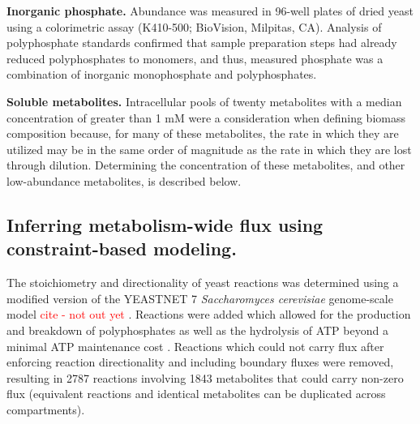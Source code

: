 \documentclass[12pt]{nature}\usepackage{graphicx, color}
\begin{document}
\textbf{Inorganic phosphate.} Abundance was measured in 96-well plates of dried yeast using a colorimetric assay (K410-500; BioVision, Milpitas, CA).  Analysis of polyphosphate standards confirmed that sample preparation steps had already reduced polyphosphates to monomers, and thus, measured phosphate was a combination of inorganic monophosphate and polyphosphates.

\textbf{Soluble metabolites.} Intracellular pools of twenty metabolites with a median concentration of greater than 1 mM were a consideration when defining biomass composition because, for many of these metabolites, the rate in which they are utilized may be in the same order of magnitude as the rate in which they are lost through dilution.  Determining the concentration of these metabolites, and other low-abundance metabolites, is described below.

\subsection{Inferring metabolism-wide flux using constraint-based modeling.}

The stoichiometry and directionality of yeast reactions was determined using a modified version of the YEASTNET 7 \textit{Saccharomyces cerevisiae} genome-scale model \textcolor{red}{cite - not out yet} \cite{Herrgard:2008gb}.  Reactions were added which allowed for the production and breakdown of polyphosphates as well as the hydrolysis of ATP beyond a minimal ATP maintenance cost \cite{Famili:2003gl}.  Reactions which could not carry flux after enforcing reaction directionality and including boundary fluxes were removed, resulting in 2787 reactions involving 1843 metabolites that could carry non-zero flux (equivalent reactions and identical metabolites can be duplicated across compartments).
\end{document}
